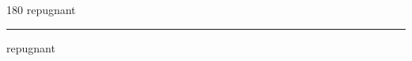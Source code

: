 
\begin{frame}
\begin{center}
\begin{turn}{180}
{\fontsize{2.5cm}{1em}\selectfont repugnant}
\end{turn}
\vspace{1em}\par  
\hrule
\vspace{1em}\par  
{\fontsize{2.5cm}{1em}\selectfont repugnant}
\end{center}
\end{frame}
